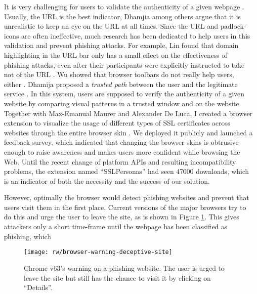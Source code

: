 It is very challenging for users to validate the authenticity of a given webpage \cite{Dhamija2006WhyPhishingWorks, Fogg2001WhatMakesSitesCredible}. Usually, the URL is the best indicator, Dhamjia \etal among others argue that it is unrealistic to keep an eye on the URL at all times. Since the URL and padlock-icons are often ineffective, much research has been dedicated to help users in this validation and prevent phishing attacks. For example, Lin \etal found that domain highlighting in the URL bar only has a small effect on the effectiveness of phishing attacks, even after their participants were explicitly instructed to take not of the URL \cite{Lin2011DomainHighlighting}. Wu \etal showed that browser toolbars do not really help users, either \cite{Wu2006SecurityToolbars}. Dhamija \etal proposed a \textit{trusted path} between the user and the legitimate service \cite{Dhamija2005DynamicSecuritySkins}. In this system, users are supposed to verify the authenticity of a given website by comparing visual patterns in a trusted window and on the website. Together with Max-Emanual Maurer and Alexander De Luca, I created a browser extension to visualize the usage of different types of SSL certificates across websites through the entire browser skin \cite{Maurer2011ShiningChrome}. We deployed it publicly and launched a feedback survey, which indicated that changing the browser skins is obtrusive enough to raise awareness and makes users more confident while browsing the Web. Until the recent change of platform APIs and resulting incompatibility problems, the extension named ``SSLPersonas'' had seen 47000 downloads, which is an indicator of both the necessity and the success of our solution.

However, optimally the browser would detect phishing websites and prevent that users visit them in the first place. Current versions of the major browsers try to do this and urge the user to leave the site, as is shown in Figure \ref{fig:rw:browser_warning}. This gives attackers only a short time-frame until the webpage has been classified as phishing, which 

\begin{figure}
	\centering
	\texttt{[image: rw/browser-warning-deceptive-site]}
	\caption{\label{fig:rw:browser_warning}Chrome v63's warning on a phishing website. The user is urged to leave the site but still has the chance to visit it by clicking on ``Details''.}
\end{figure}


